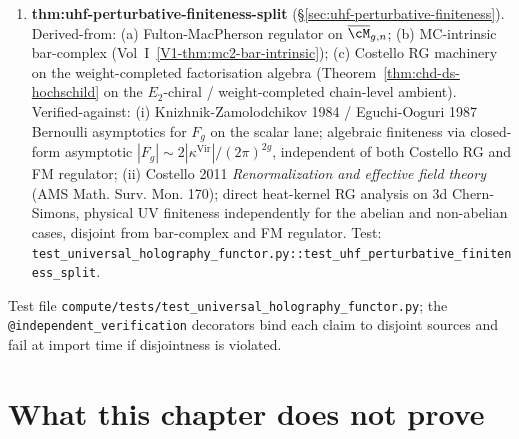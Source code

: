 \begin{enumerate}
\item \textbf{thm:uhf-perturbative-finiteness-split}
 \textup{(}\S\ref{sec:uhf-perturbative-finiteness}\textup{)}.
 Derived-from: \textup{(a)} Fulton-MacPherson regulator on
 $\overline{\cM}_{g,n}$; \textup{(b)} MC-intrinsic bar-complex
 \textup{(}Vol~I~\ref*{V1-thm:mc2-bar-intrinsic}\textup{)};
 \textup{(c)} Costello RG machinery on the weight-completed
 factorisation algebra \textup{(}Theorem~\ref*{thm:chd-ds-hochschild}
 on the $E_2$-chiral / weight-completed chain-level ambient\textup{)}.
 Verified-against: \textup{(i)} Knizhnik-Zamolodchikov 1984 /
 Eguchi-Ooguri 1987 Bernoulli asymptotics for $F_g$ on the
 scalar lane; algebraic finiteness via closed-form asymptotic
 $|F_g| \sim 2|\kappa^{\mathrm{Vir}}| / (2\pi)^{2g}$, independent
 of both Costello RG and FM regulator;
 \textup{(ii)} Costello 2011 \emph{Renormalization and effective
 field theory} (AMS Math. Surv. Mon. 170); direct heat-kernel
 RG analysis on 3d Chern-Simons, physical UV finiteness
 independently for the abelian and non-abelian cases, disjoint
 from bar-complex and FM regulator.
 Test: \texttt{test\_universal\_holography\_functor.py::test\_uhf\_perturbative\_finiteness\_split}.
\end{enumerate}

Test file
\texttt{compute/tests/test\_universal\_holography\_functor.py};
the \texttt{@independent\_verification} decorators bind each
claim to disjoint sources and fail at import time if disjointness
is violated.

\section{What this chapter does not prove}
\label{sec:uhf-not-proved}

